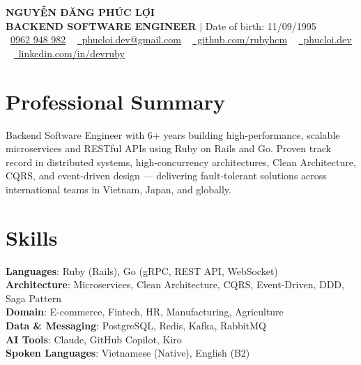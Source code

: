 \documentclass[a4paper,11pt]{article}
\begin{document}
\begin{center}
    {\Huge \textbf{\textcolor{PrimaryColor}{NGUYỄN ĐĂNG PHÚC LỢI}}} \\ \vspace{5pt}
    \small \textbf{\textcolor{SecondaryColor}{BACKEND SOFTWARE ENGINEER}} $|$ \small Date of birth: 11/09/1995 \\ \vspace{4pt}
    \small \raisebox{-0.1\height}{\textcolor{PrimaryColor}{\faPhone}}\ \href{tel:0962948982}{0962 948 982} ~
    \href{mailto:phucloi.dev@gmail.com}{\raisebox{-0.2\height}{\textcolor{PrimaryColor}{\faEnvelope}}\ phucloi.dev@gmail.com} ~
    \href{https://github.com/rubyhcm}{\raisebox{-0.2\height}{\textcolor{PrimaryColor}{\faGithub}}\ github.com/rubyhcm} ~
    \href{https://phucloi.dev/}{\raisebox{-0.2\height}{\textcolor{PrimaryColor}{\faGlobe}}\ phucloi.dev} ~
    \href{https://www.linkedin.com/in/devruby/}{\raisebox{-0.2\height}{\textcolor{PrimaryColor}{\faLinkedin}}\ linkedin.com/in/devruby}
\end{center}

\section{Professional Summary}
\small{Backend Software Engineer with 6+ years building high-performance, scalable microservices and RESTful APIs using Ruby on Rails and Go. Proven track record in distributed systems, high-concurrency architectures, Clean Architecture, CQRS, and event-driven design — delivering fault-tolerant solutions across international teams in Vietnam, Japan, and globally.}
\vspace{-5pt}

\section{Skills}
 \begin{itemize}[leftmargin=0.15in, label={}]
    \small{\item{
     \textbf{Languages}{: Ruby (Rails), Go (gRPC, REST API, WebSocket)} \\ \vspace{1pt}
     \textbf{Architecture}{: Microservices, Clean Architecture, CQRS, Event-Driven, DDD, Saga Pattern} \\ \vspace{1pt}
     \textbf{Domain}{: E-commerce, Fintech, HR, Manufacturing, Agriculture} \\ \vspace{1pt}
     \textbf{Data \& Messaging}{: PostgreSQL, Redis, Kafka, RabbitMQ} \\ \vspace{1pt}
     \textbf{AI Tools}{: Claude, GitHub Copilot, Kiro} \\ \vspace{1pt}
     \textbf{Spoken Languages}{: Vietnamese (Native), English (B2)}
    }}
 \end{itemize}
\vspace{-5pt}
\end{document}
